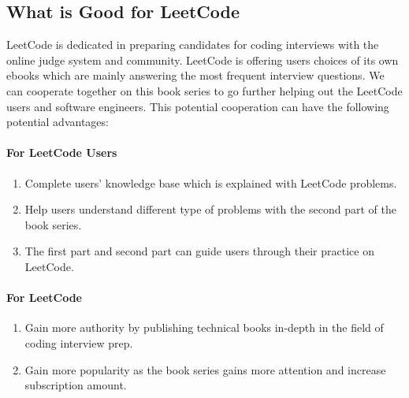 \documentclass[12pt]{article}
\begin{document}






\subsection{What is Good for LeetCode}
LeetCode is dedicated in preparing candidates for coding interviews with the online judge system and community. LeetCode is offering users choices of its own ebooks which are mainly answering the most frequent interview questions. We can cooperate together on this book series to go further helping out the LeetCode users and software engineers.    This potential cooperation can have the following potential advantages:

\paragraph{For LeetCode Users}
\begin{enumerate}
    \item Complete users' knowledge base which is explained with LeetCode problems. 
    \item Help users understand different type of problems with the second part of the book series.
    \item The first part and second part can guide users through their practice on LeetCode.
\end{enumerate}

\paragraph{For LeetCode}
\begin{enumerate}
    \item Gain more authority by publishing technical books in-depth in the field of coding interview prep. 
    \item Gain more popularity as the book series gains more attention and increase subscription amount. 
\end{enumerate}
\end{document}
